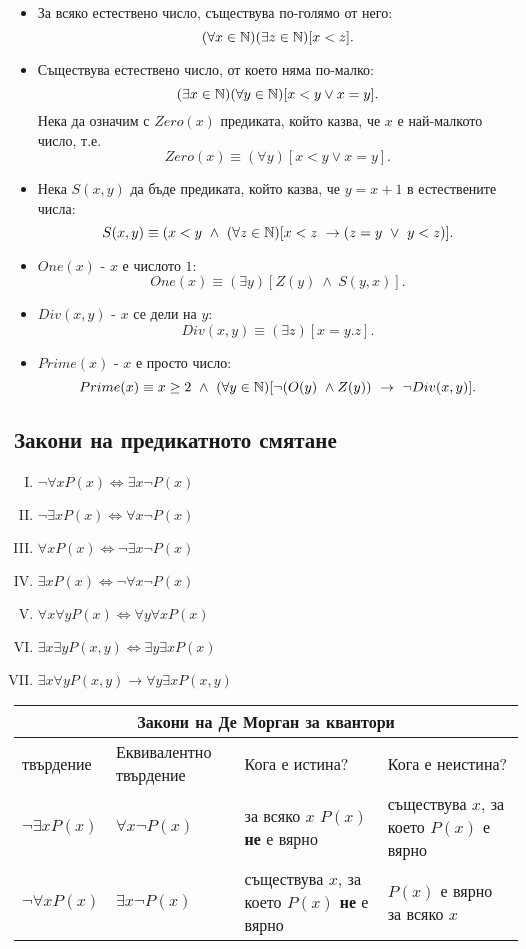\begin{example}
  \begin{itemize}
  \item
    За всяко естествено число, съществува по-голямо от него:
    \[(\forall x\in\mathbb{N})(\exists z\in\mathbb{N})[x < z].\]
  \item
    Съществува естествено число, от което няма по-малко:
    \[(\exists x\in\mathbb{N})(\forall y\in\mathbb{N})[x < y \vee x = y].\]
    Нека да означим с $Zero(x)$ предиката, който казва, че $x$ е най-малкото число, т.е.
    \[Zero(x) \equiv (\forall y)[x < y \vee x =y].\]
  \item
    Нека $S(x,y)$ да бъде предиката, който казва, че $y = x+1$ в естествените числа:
    \[S(x,y) \equiv (x < y\ \wedge\ (\forall z\in\mathbb{N})[x < z\ \rightarrow (z = y\ \vee\ y < z)].\]
  \item
    $One(x)$ - $x$ е числото $1$:
    \[One(x) \equiv (\exists y)[Z(y)\ \wedge\ S(y,x)].\]
  \item
    $Div(x,y)$ - $x$ се дели на $y$:
    \[Div(x,y) \equiv (\exists z)[x = y.z].\]
  \item
    $Prime(x)$ - $x$ е просто число:
    \[Prime(x) \equiv x \geq 2\ \wedge\ (\forall y\in\Nat)[\neg (O(y)\ \wedge Z(y))\ \rightarrow\ \neg Div(x,y)].\]
  \end{itemize}
\end{example}


\subsection*{Закони на предикатното смятане}

\begin{enumerate}[(I)]
  \item
    $\neg\forall x P(x) \iff \exists x \neg P(x)$
  \item
    $\neg\exists x P(x) \iff \forall x \neg P(x)$
  \item
    $\forall x P(x) \iff \neg\exists x \neg P(x)$
  \item
    $\exists x P(x) \iff \neg\forall x \neg P(x)$
  \item
    $\forall x \forall y P(x) \iff \forall y\forall x P(x)$
  \item
    $\exists x\exists y P(x,y) \iff \exists y \exists x P(x)$  
  \item
    $\exists x\forall y P(x,y) \rightarrow \forall y \exists x P(x,y)$
\end{enumerate}

\bigskip
\begin{tabular}{|l|p{2.5cm}|p{3.2cm}|p{3cm}|}
  \hline
  \multicolumn{4}{|c|}{{\bf Закони на Де Морган за квантори}}\\
  \hline
  твърдение & Еквивалентно твърдение & Кога е истина? & Кога е неистина?\\
  \hline
  $\neg \exists x P(x)$ & $\forall x \neg P(x)$ & за всяко $x$ $P(x)$ {\bf не} е вярно & съществува $x$, за което $P(x)$ е вярно \\
  \hline
  $\neg \forall x P(x)$ & $\exists x \neg P(x)$ & съществува $x$, за което $P(x)$ {\bf не} е вярно & $P(x)$ е вярно за всяко $x$\\
  \hline
\end{tabular}  
\bigskip

